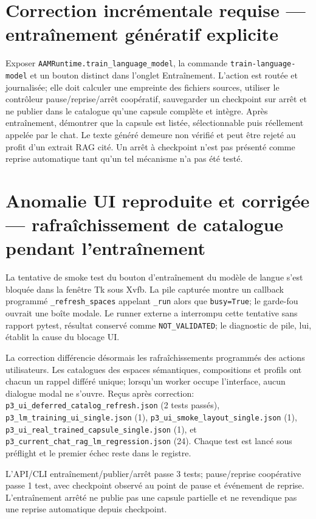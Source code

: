 \documentclass[11pt,a4paper]{article}
\begin{document}
\section{Correction incrémentale requise — entraînement génératif explicite}
Exposer \texttt{AAMRuntime.train\_language\_model}, la commande \texttt{train-language-model} et un bouton distinct dans l'onglet Entraînement. L'action est routée et journalisée; elle doit calculer une empreinte des fichiers sources, utiliser le contrôleur pause/reprise/arrêt coopératif, sauvegarder un checkpoint sur arrêt et ne publier dans le catalogue qu'une capsule complète et intègre. Après entraînement, démontrer que la capsule est listée, sélectionnable puis réellement appelée par le chat. Le texte généré demeure non vérifié et peut être rejeté au profit d'un extrait RAG cité. Un arrêt à checkpoint n'est pas présenté comme reprise automatique tant qu'un tel mécanisme n'a pas été testé.


\section{Anomalie UI reproduite et corrigée — rafraîchissement de catalogue pendant l'entraînement}
La tentative de smoke test du bouton d'entraînement du modèle de langue s'est bloquée dans la fenêtre Tk sous Xvfb. La pile capturée montre un callback programmé \texttt{\_refresh\_spaces} appelant \texttt{\_run} alors que \texttt{busy=True}; le garde-fou ouvrait une boîte modale. Le runner externe a interrompu cette tentative sans rapport pytest, résultat conservé comme \texttt{NOT\_VALIDATED}; le diagnostic de pile, lui, établit la cause du blocage UI.

La correction différencie désormais les rafraîchissements programmés des actions utilisateurs. Les catalogues des espaces sémantiques, compositions et profils ont chacun un rappel différé unique; lorsqu'un worker occupe l'interface, aucun dialogue modal ne s'ouvre. Reçus après correction: \texttt{p3\_ui\_deferred\_catalog\_refresh.json} (2 tests passés), \texttt{p3\_lm\_training\_ui\_single.json} (1), \texttt{p3\_ui\_smoke\_layout\_single.json} (1), \texttt{p3\_ui\_real\_trained\_capsule\_single.json} (1), et \texttt{p3\_current\_chat\_rag\_lm\_regression.json} (24). Chaque test est lancé sous préflight et le premier échec reste dans le registre.

L'API/CLI entraînement/publier/arrêt passe 3 tests; pause/reprise coopérative passe 1 test, avec checkpoint observé au point de pause et événement de reprise. L'entraînement arrêté ne publie pas une capsule partielle et ne revendique pas une reprise automatique depuis checkpoint.
\end{document}
